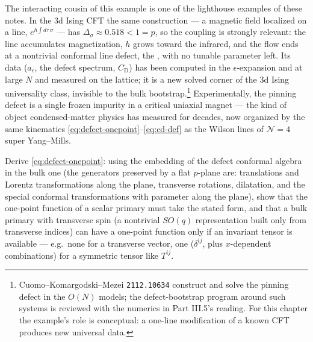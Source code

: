 The interacting cousin of this example is one of the lighthouse
examples of these notes. In the 3d Ising CFT the same construction ---
a magnetic field localized on a line, $e^{h\int d\tau\,\sigma}$ --- has
$\Delta_\sigma \approx 0.518 < 1 = p$, so the coupling is strongly
relevant: the line accumulates magnetization, $h$ grows toward the
infrared, and the flow ends at a nontrivial conformal line defect, the
, with no tunable parameter left. Its data
($a_\epsilon$, the defect spectrum, $C_{\mathrm D}$) has been computed
in the $\epsilon$-expansion and at large $N$ and measured on the
lattice; it is a new solved corner of the 3d Ising
universality class, invisible to the bulk
bootstrap.\footnote{Cuomo--Komargodski--Mezei \texttt{2112.10634}
construct and solve the pinning defect in the $O(N)$ models; the
defect-bootstrap program around such systems is reviewed with the
numerics in Part III.5's reading. For this chapter the example's role
is conceptual: a one-line modification of a known CFT produces new
universal data.} Experimentally, the pinning defect is a single frozen
impurity in a critical uniaxial magnet --- the kind of object
condensed-matter physics has measured for decades, now organized by
the same kinematics \eqref{eq:defect-onepoint}--\eqref{eq:cd-def} as
the Wilson lines of $\mathcal N = 4$ super Yang--Mills.

\begin{exercise}[easy]
\label{exr:onepoint-form}
Derive \eqref{eq:defect-onepoint}: using the embedding of the defect
conformal algebra in the bulk one (the generators preserved by a flat
$p$-plane are: translations and Lorentz transformations along the
plane, transverse rotations, dilatation, and the special conformal
transformations with parameter along the plane), show that the
one-point function of a scalar primary must take the stated form, and
that a bulk primary with transverse spin (a nontrivial $SO(q)$
representation built only from transverse indices) can have a one-point
function only if an invariant tensor is available --- e.g.\ none for a
transverse vector, one ($\delta^{ij}$, plus $x$-dependent combinations)
for a symmetric tensor like $T^{ij}$.
\end{exercise}

